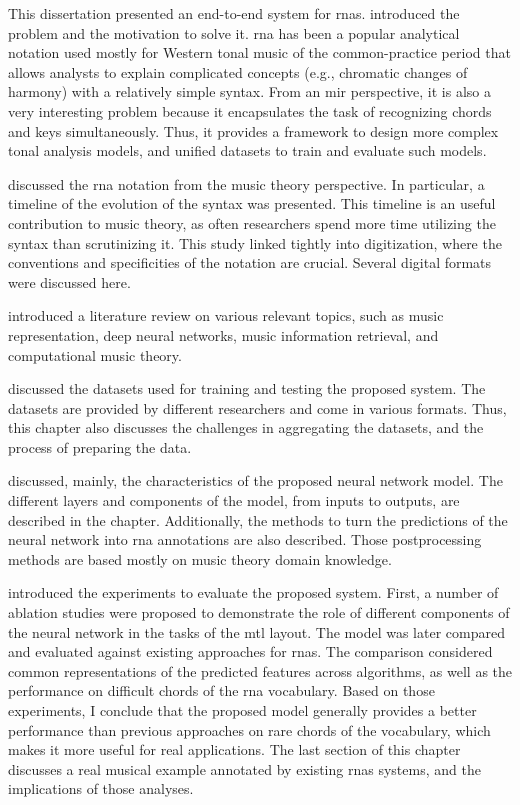 
This dissertation presented an end-to-end system for
\glspl{rna}.  introduced the problem
and the motivation to solve it. \gls{rna} has been a popular
analytical notation used mostly for Western tonal music of
the common-practice period that allows analysts to explain
complicated concepts (e.g., chromatic changes of harmony)
with a relatively simple syntax. From an \gls{mir}
perspective, it is also a very interesting problem because
it encapsulates the task of recognizing chords and keys
simultaneously. Thus, it provides a framework to design more
complex tonal analysis models, and unified datasets to train
and evaluate such models.

 discussed the
\gls{rna} notation from the music theory perspective. In
particular, a timeline of the evolution of the syntax was
presented. This timeline is an useful contribution to music
theory, as often researchers spend more time utilizing the
syntax than scrutinizing it. This study linked tightly into
digitization, where the conventions and specificities of the
notation are crucial. Several digital formats were discussed
here.

 introduced a literature review on
various relevant topics, such as music representation, deep
neural networks, music information retrieval, and
computational music theory.

 discussed the
datasets used for training and testing the proposed system.
The datasets are provided by different researchers and come
in various formats. Thus, this chapter also discusses the
challenges in aggregating the datasets, and the process of
preparing the data.

 discussed, mainly, the characteristics
of the proposed neural network model. The different layers
and components of the model, from inputs to outputs, are
described in the chapter. Additionally, the methods to turn
the predictions of the neural network into \gls{rna}
annotations are also described. Those postprocessing methods
are based mostly on music theory domain knowledge.

 introduced the experiments
to evaluate the proposed system. First, a number of ablation
studies were proposed to demonstrate the role of different
components of the neural network in the tasks of the
\gls{mtl} layout. The model was later compared and evaluated
against existing approaches for \glspl{rna}. The comparison
considered common representations of the predicted features
across algorithms, as well as the performance on difficult
chords of the \gls{rna} vocabulary. Based on those
experiments, I conclude that the proposed model generally
provides a better performance than previous approaches on
rare chords of the vocabulary, which makes it more useful
for real applications. The last section of this chapter
discusses a real musical example annotated by existing
\glspl{rna} systems, and the implications of those analyses.
